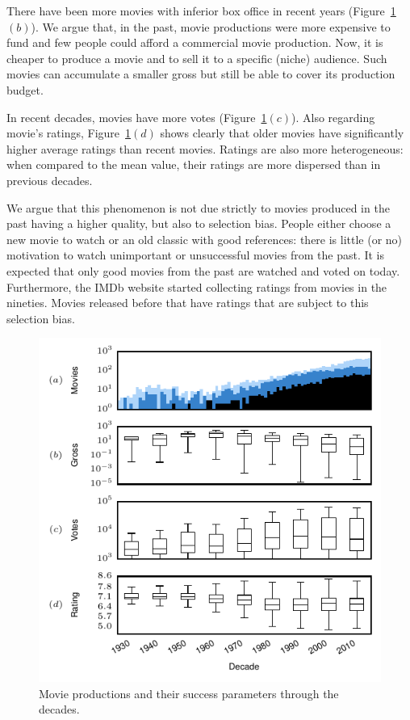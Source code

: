 There have been more movies with inferior box office in recent years
(Figure~\ref{fig:boxplot_success}$(b)$). We argue that, in the past, movie
productions were more expensive to fund and few people could afford a
commercial movie production.  Now, it is cheaper to produce a movie and to sell
it to a specific (niche) audience. Such movies can accumulate a smaller gross
but still be able to cover its production budget. 

In recent decades, movies have more votes
(Figure~\ref{fig:boxplot_success}$(c)$). Also regarding movie's ratings,
Figure~\ref{fig:boxplot_success}$(d)$ shows clearly that older movies have
significantly higher average ratings than recent movies. Ratings are also more
heterogeneous: when compared to the mean value, their ratings are more
dispersed than in previous decades.

We argue that this phenomenon is not due strictly to movies produced in the
past having a higher quality, but also to selection bias. People either choose
a new movie to watch or an old classic with good references: there is little
(or no) motivation to watch unimportant or unsuccessful movies from the past.
It is expected that only good movies from the past are watched and voted on
today.  Furthermore, the IMDb website started collecting ratings from movies in
the nineties. Movies released before that have ratings that are subject to this
selection bias. 

\begin{figure}[tb]\begin{center}
\includegraphics[width=0.85\columnwidth]{../../images/boxplot_success.pdf}
\caption{\label{fig:boxplot_success}Movie productions and their success
parameters through the decades.}
\end{center}\end{figure}

